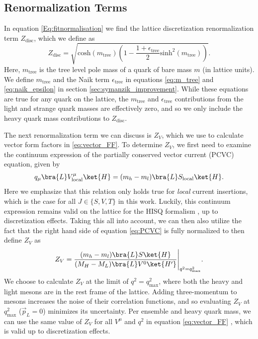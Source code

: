 \subsection{Renormalization Terms}\label{sec:renorm_terms}
In equation \ref{Eq:fitnormalisation} we find the lattice discretization renormalization term $Z_\mathrm{disc}$, which we define as
\begin{equation}\label{eq:Zdisc}
    Z_\mathrm{disc} = \sqrt{\mathrm{cosh}(m_{\mathrm{tree}})\left(1 - \frac{1+\epsilon_\mathrm{tree}}{2}\mathrm{sinh}^2(m_\mathrm{tree})\right)}.
\end{equation}
Here, $m_\mathrm{tree}$ is the tree level pole mass of a quark of bare mass $m$ (in lattice units). We define $m_\mathrm{tree}$ and the Naik term $\epsilon_\mathrm{tree}$ in equations \ref{eq:m_tree} and \ref{eq:naik_epsilon} in section \ref{sec:symanzik_improvement}.  While these equations are true for any quark on the lattice, the $m_\mathrm{tree}$ and $\epsilon_\mathrm{tree}$ contributions from the light and strange quark masses are effectively zero, and so we only include the heavy quark mass contributions to $Z_\mathrm{disc}$.  

The next renormalization term we can discuss is $Z_V$, which we use to calculate vector form factors in \ref{eq:vector_FF}. To determine $Z_V$, we first need to examine the continuum expression of the partially conserved vector current (PCVC) equation, given by
\begin{equation}\label{eq:PCVC}
    q_\mu\bra{L}V_\mathrm{local}^\mu\ket{H} = (m_h - m_l)\bra{L}S_\mathrm{local}\ket{H}.
\end{equation}
Here we emphasize that this relation only holds true for \textit{local} current insertions, which is the case for all $J\in\{S,V,T\}$ in this work.  Luckily, this continuum expression remains valid on the lattice for the HISQ formalism \cite{HISQ:2006rc}, up to discretization effects.  Taking this all into account, we can then also utilize the fact that the right hand side of equation \ref{eq:PCVC} is fully normalized \cite{Na_2010} to then define $Z_V$ as
\begin{equation}\label{Eq:Zv}
    Z_V=\frac{(m_h-m_l)\bra{L}S\ket{H}}{(M_{H}-M_{L})\bra{L}V^{0}\ket{{H'}}}\Bigg\rvert_{q^2=q^2_{\mathrm{max}}}.
\end{equation}
We choose to calculate $Z_V$ at the limit of $q^2=q_\mathrm{max}^2$, where both the heavy and light mesons are in the rest frame of the lattice.  Adding three-momentum to mesons increases the noise of their correlation functions, and so evaluating $Z_V$ at $q_\mathrm{max}^2$ ($\vec{p}_L = 0$) minimizes its uncertainty.  Per ensemble and heavy quark mass, we can use the same value of $Z_V$ for all $V^\mu$ and $q^2$ in equation \ref{eq:vector_FF} \cite{Cooper_2020}, which is valid up to discretization effects.

